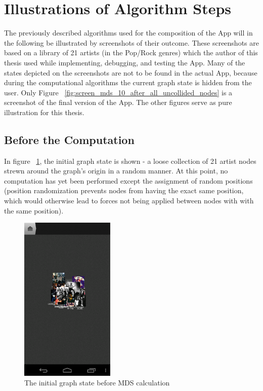 \section{Illustrations of Algorithm Steps}

The previously described algorithms used for the composition of the App will in the following be  illustrated by screenshots of their outcome. These screenshots are based on a library of 21 artists (in the Pop/Rock genres) which the author of this thesis used while implementing, debugging, and testing the App. Many of the states depicted on the screenshots are not to be found in the actual App, because during the computational algorithms the current graph state is hidden from the user. Only Figure ~\ref{fig:screen_mds_10_after_all_uncollided_nodes} is a screenshot of the final version of the App. The other figures serve as pure illustration for this thesis.

\subsection{Before the Computation}

In figure ~\ref{fig:screen_mds_1_initial}, the initial graph state is shown - a loose collection of 21 artist nodes strewn around the graph's origin in a random manner. At this point, no computation has yet been performed except the assignment of random positions (position randomization prevents nodes from having the exact same position, which would otherwise lead to forces not being applied between nodes with with the same position).

\begin{figure}[H]
  \centering
    \includegraphics[width=0.4\textwidth]{figures/screen_mds_1_initial}
  \caption{The initial graph state before MDS calculation}
  \label{fig:screen_mds_1_initial}
\end{figure}

